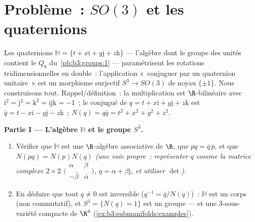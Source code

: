 \section{Problème~: \texorpdfstring{$SO(3)$}{SO(3)} et les
quaternions}

\begin{problem}\label{pb:b3:submanifolds:1}
Les quaternions $\mathbb H = \{t + x\mathrm i + y\mathrm j +
z\mathrm k\}$ --- l'algèbre dont le groupe des unités
contient le $Q_8$ du~\cref{pb:b3:groups:1} --- paramétrisent
les rotations tridimensionnelles en double~: l'application
«~conjuguer par un quaternion unitaire~» est un morphisme
surjectif $S^3 \to SO(3)$ de noyau $\{\pm1\}$. Nous
construisons tout. Rappel/définition~: la multiplication est
$\R$-bilinéaire avec $\mathrm i^2 = \mathrm j^2 = \mathrm
k^2 = \mathrm{ijk} = -1$~; le conjugué de $q = t +
x\mathrm i + y\mathrm j + z\mathrm k$ est $\bar q = t -
x\mathrm i - y\mathrm j - z\mathrm k$~; $N(q) = q\bar q =
t^2 + x^2 + y^2 + z^2$.

\medskip
\noindent\textbf{Partie I --- L'algèbre $\mathbb H$ et le
groupe $S^3$.}
\begin{enumerate}
  \item Vérifier que $\mathbb H$ est une $\R$-algèbre
        associative de  $\R$, que $\overline{pq} =
        \bar q\,\bar p$, et que $N(pq) = N(p)N(q)$
        \emph{(une voie propre~: représenter $q$ comme la
        matrice complexe $2\times2$
        $\bigl(\begin{smallmatrix}\alpha & \beta\\
        -\bar\beta & \bar\alpha\end{smallmatrix}\bigr)$, $q =
        \alpha + \beta\mathrm j$, et utiliser $\det$)}.
  \item En déduire que tout $q \neq 0$ est inversible
        ($q^{-1} = \bar q/N(q)$)~: $\mathbb H$ est un corps
        (non commutatif), et $S^3 = \{N(q) = 1\}$ est un
        groupe --- et une $3$-sous-variété compacte de
        $\R^4$ (\cref{ex:b3:submanifolds:examples}).
\end{enumerate}


\end{problem}
